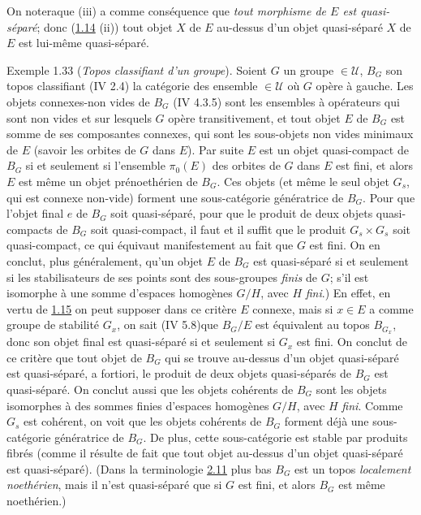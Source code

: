 On notera\pageoriginale que (iii) a comme conséquence que \emph{tout
  morphisme de
  $E$ est quasi-séparé}; donc (\hyperref[VI.prop1.14]{1.14} (ii)) tout objet $X$ de $E$
  au-dessus d'un objet quasi-séparé $X$ de $E$ est lui-même
  quasi-séparé.

\begin{enonce*}[remark]{Exemple 1.33}
(\emph{Topos classifiant d'un groupe}). Soient $G$ un groupe $\in
𝒰$, $B_G$ son topos classifiant (IV 2.4) \ie la catégorie
des ensemble $\in 𝒰$ où $G$ opère à gauche. Les objets
connexes-non vides de $B_G$ (IV 4.3.5) sont les ensembles à
opérateurs qui sont non vides et sur lesquels $G$ opère
transitivement, et tout objet $E$ de $B_G$ est somme de ses
composantes connexes, qui sont les sous-objets non vides minimaux de
$E$ (savoir les orbites de $G$ dans $E$). Par suite $E$ est un objet
quasi-compact de $B_G$ si et seulement si l'ensemble $\pi_0(E)$ des
orbites de $G$ dans $E$ est fini, et alors $E$ est même un objet
prénoethérien de $B_G$. Ces objets (et même le seul objet $G_s$, qui
est connexe non-vide) forment une sous-catégorie génératrice de
$B_G$. Pour que l'objet final $e$ de $B_G$ soit quasi-séparé, \ie
pour que le produit de deux objets quasi-compacts de $B_G$ soit
quasi-compact, il faut et il suffit que le produit $G_s\times G_s$
soit quasi-compact, ce qui équivaut manifestement au fait que $G$
est fini. On en conclut, plus généralement, qu'un objet $E$ de $B_G$
est quasi-séparé si et seulement si les stabilisateurs de ses points
sont des sous-groupes \emph{finis} de $G$; \ie s'il est isomorphe à
une somme d'espaces homogènes $G/H$, avec $H$ \emph{fini}.) En
effet, en vertu de \hyperref[VI.cor1.15]{1.15} on peut supposer dans ce critère
$E$ connexe, mais si $x \in E$ a comme groupe de stabilité $G_x$, on
sait (IV 5.8)\pageoriginale que $B_G / E$ est équivalent au topos
$B_{G_x}$, donc son objet final est quasi-séparé si et seulement si
$G_x$ est fini. On conclut de ce critère que tout objet de $B_G$ qui
se trouve au-dessus d'un objet quasi-séparé est quasi-séparé, a
fortiori, le produit de deux objets quasi-séparés de $B_G$ est
quasi-séparé. On conclut aussi que les objets cohérents de $B_G$
sont les objets isomorphes à des sommes finies d'espaces homogènes
$G/H$, avec $H$ \emph{fini}. Comme $G_s$ est cohérent, on voit que
les objets cohérents de $B_G$ forment déjà une sous-catégorie
génératrice de $B_G$. De plus, cette sous-catégorie est stable par
produits fibrés (comme il résulte de fait que tout objet au-dessus
d'un objet quasi-séparé est quasi-séparé). (Dans la terminologie
\hyperref[VI.def2.11]{2.11} plus bas $B_G$ est un topos \emph{localement
noethérien}, mais il n'est quasi-séparé que si $G$ est fini, et
alors $B_G$ est même noethérien.)


\end{enonce*}
